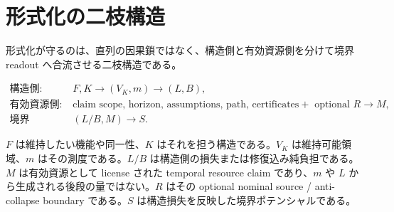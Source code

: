 \documentclass[12pt,a4paper]{article}
\begin{document}
\begin{abstract}
本稿では、防御的な断りを各所に散らさない。Lean が保証する範囲と保証しない範囲は第7節に集約し、本文では主張の強度を次の棚で読む。

\begin{quote}
{\small\ttfamily\noindent
証明済み定理 \\~~Lean~上で宣言され、監査表に分類された境界帰結。 \\~ \\証明書要求主張 \\~~型は用意されているが、使うには明示的な~witness~/~bound~/ \\~~composition~rule~/~protocol~が必要な~claim。 \\~ \\定義・台帳 \\~~データを束ねる、射影する、監査可能な形に整えるための宣言。 \\~ \\解釈・経験仮説 \\~~ドメイン側の検証、proxy~妥当性、介入予測、外部再現を待つ読み。
}
\end{quote}

この形式化は、理論が大きくなったときにも、どの部分が証明済みで、どの部分が証明書要求で、どの部分が経験的研究プログラムなのかを説明し続けるための仕組みである。
\end{abstract}

\section{形式化の二枝構造}\label{ux5f62ux5f0fux5316ux306eux4e8cux679dux69cbux9020}

形式化が守るのは、直列の因果鎖ではなく、構造側と有効資源側を分けて境界 readout へ合流させる二枝構造である。

\[
\begin{array}{ll}
\text{構造側:} & F,K \to (V_K,m) \to (L,B),\\
\text{有効資源側:} & \text{claim scope, horizon, assumptions, path, certificates}
                 + \text{ optional }R \to M,\\
\text{境界 readout:} & (L/B,M) \to S.
\end{array}
\]

\(F\) は維持したい機能や同一性、\(K\) はそれを担う構造である。\(V_K\) は維持可能領域、\(m\) はその測度である。\(L/B\) は構造側の損失または修復込み純負担である。\(M\) は有効資源として license された temporal resource claim であり、\(m\) や \(L\) から生成される後段の量ではない。\(R\) はその optional nominal source / anti-collapse boundary である。\(S\) は構造損失を反映した境界ポテンシャルである。
\end{document}

